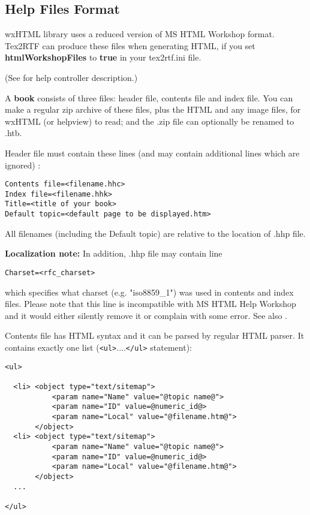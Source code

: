 \subsection{Help Files Format}\label{helpformat}

wxHTML library uses a reduced version of MS HTML Workshop format.
Tex2RTF can produce these files when generating HTML, if you set {\bf htmlWorkshopFiles} to {\bf true} in
your tex2rtf.ini file.

(See  for help controller description.)

A {\bf book} consists of three files: header file, contents file and index file.
You can make a regular zip archive of these files, plus the HTML and any image files,
for wxHTML (or helpview) to read; and the .zip file can optionally be renamed to .htb.


Header file must contain these lines (and may contain additional lines which are ignored) :

\begin{verbatim}
Contents file=<filename.hhc>
Index file=<filename.hhk>
Title=<title of your book>
Default topic=<default page to be displayed.htm>
\end{verbatim}

All filenames (including the Default topic) are relative to the 
location of .hhp file.

{\bf Localization note:} In addition, .hhp file may contain line

\begin{verbatim}
Charset=<rfc_charset>
\end{verbatim}

which specifies what charset (e.g. "iso8859\_1") was used in contents
and index files. Please note that this line is incompatible with
MS HTML Help Workshop and it would either silently remove it or complain
with some error. See also 
.


Contents file has HTML syntax and it can be parsed by regular HTML parser. It contains exactly one list
({\tt <ul>}....{\tt </ul>} statement):

\begin{verbatim}
<ul>

  <li> <object type="text/sitemap">
           <param name="Name" value="@topic name@">
           <param name="ID" value=@numeric_id@>
           <param name="Local" value="@filename.htm@">
       </object>
  <li> <object type="text/sitemap">
           <param name="Name" value="@topic name@">
           <param name="ID" value=@numeric_id@>
           <param name="Local" value="@filename.htm@">
       </object>
  ...    

</ul>
\end{verbatim}

